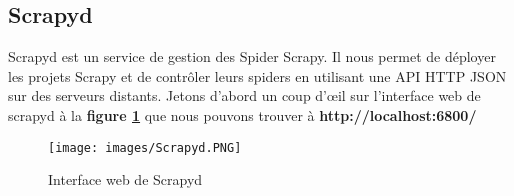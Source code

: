  \subsection{Scrapyd}
Scrapyd est un service de gestion des Spider Scrapy.
Il nous permet de déployer les projets Scrapy et de contrôler leurs spiders en utilisant une API HTTP JSON sur des serveurs distants.
Jetons d'abord un coup d'œil sur l'interface web de scrapyd à la \textbf{figure \ref{fig:Scrapyd's web interface}} que nous pouvons trouver à \textbf{http://localhost:6800/} 
\begin{figure}[H]
            \centering
            \texttt{[image: images/Scrapyd.PNG]}
            \caption{Interface web de Scrapyd \cite{book}}
            \label{fig:Scrapyd's web interface}  
        \end{figure}

